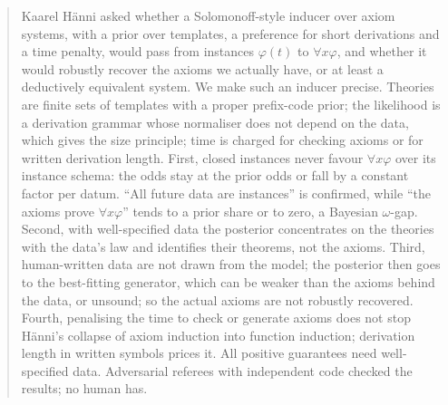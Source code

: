 \begin{abstract}
Kaarel H\"anni asked whether a Solomonoff-style inducer over axiom systems, with a prior over templates, a preference for short derivations and a time penalty, would pass from instances $\varphi(t)$ to $\forall x\varphi$, and whether it would robustly recover the axioms we actually have, or at least a deductively equivalent system. We make such an inducer precise. Theories are finite sets of templates with a proper prefix-code prior; the likelihood is a derivation grammar whose normaliser does not depend on the data, which gives the size principle; time is charged for checking axioms or for written derivation length. First, closed instances never favour $\forall x\varphi$ over its instance schema: the odds stay at the prior odds or fall by a constant factor per datum. ``All future data are instances'' is confirmed, while ``the axioms prove $\forall x\varphi$'' tends to a prior share or to zero, a Bayesian $\omega$-gap. Second, with well-specified data the posterior concentrates on the theories with the data's law and identifies their theorems, not the axioms. Third, human-written data are not drawn from the model; the posterior then goes to the best-fitting generator, which can be weaker than the axioms behind the data, or unsound; so the actual axioms are not robustly recovered. Fourth, penalising the time to check or generate axioms does not stop H\"anni's collapse of axiom induction into function induction; derivation length in written symbols prices it. All positive guarantees need well-specified data. Adversarial referees with independent code checked the results; no human has.
\end{abstract}
